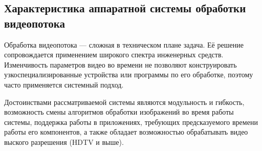 











\subsection{Характеристика аппаратной системы обработки видеопотока}
\label{sec:economics:characteristics}

Обработка видеопотока --- сложная в техническом плане задача. Её решение сопровождается
применением широкого спектра инженерных средств. Изменчивость параметров видео во
времени не позволяют конструировать узкоспециализированные устройства или программы по его
обработке, поэтому часто применяется системный подход.

Достоинствами рассматриваемой системы являются модульность и гибкость, возможность
смены алгоритмов обработки изображений во время работы системы, поддержка работы в приложениях,
требующих предсказуемого времени работы его компонентов, а также обладает возможностью
обрабатывать видео выского разрешения (HDTV и выше).

